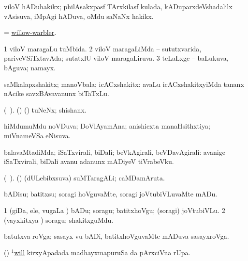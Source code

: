 \bentry
{}
\gl{\nA}
\bmng
viloV hADuhakikx; philAsakxpasf TArxkilasf kulada, kADuparxdeVshadalilx vAsisuva, iMpAgi hADuva, oMdu saNaNx hakikx. 
\emng
\eentry

\bentry
{}
\gl{\nA}
\bmng
= \hyperlink{willow-warbler}{willow-warbler}. 
\emng
\eentry

\bentry
{}
\gl{\gu}
\bmng
\bnum
\num{1} viloV maragaLu tuMbida. 
\num{2} viloV maragaLiMda -- sututxvarida, pariveVSiTxtavAda; sutatxlU viloV maragaLiruva. 
\num{3} teLaLxge -- baLukuva, bAguva; namayx. 
\enum
\emng
\eentry

\bentry
{}
\gl{\nA}
\bmng
saMkalapxshakitx; manoVbala; icACxshakitx:  avaLu icACxshakitxyiMda tananx nAcike savxBAvavanunx biTaTxLu. 
\emng
\eentry

\bentry
{}
\gl{\nA} (\bava\ ). 
\bmng
(\birx) (\ashi) tuNeNx; shishanx. 
\emng
\eentry

\bentry
{}
\gl{\gu}
\bmng
hiMdumuMdu noVDuva; DoVlAyamAna; anishicxta manaHsithxtiya; miVnameVSa eNisuva. 
\emng
\eentry

\bentry
{}
\gl{\kirxvi}
\bmng
balavaMtadiMda; iSaTxvirali, biDali; beVkAgirali, beVDavAgirali:  avanige iSaTxvirali, biDali avanu adanunx mADiyeV tiVrabeVku. 
\emng
\eentry

\bentry
{}
\gl{\nA} (\bava\ ). 
\bmng
(\AseTxrXV) (dULebibxsuva) suMTaragALi; caMDamAruta. 
\emng
\eentry

\bentry
{} 
\gl{\sakirx}
\expl{}
\bmng
bADisu; batitxsu; soragi hoVguvaMte, soragi joVtubiVLuvaMte mADu. 
\emng

\noindent
\gl{\akirx}
\expl{}
\bmng
\bnum
\num{1} (giDa, ele, \mo vugaLa \vi) bADu; soragu; batitxhoVgu; (soragi) joVtubiVLu. 
\num{2} (vayxkitxya \vi) soragu; shakitxguMdu. 
\enum
\emng
\eentry

\bentry
{} 
\gl{\nA}
\expl{}
\bmng
batutxva roVga; sasayx \mo vu bADi, batitxhoVguvaMte mADuva sasayxroVga. 
\emng
\eentry

\bentry
{} 
\gl{\kirx}
\expl{}
\bmng
(\pArxparx) \hyperlink{will(1)}{$^1$will} kirxyApadada madhayxmapuruSa \Eva da pArxciVna rUpa. 
\emng
\eentry

